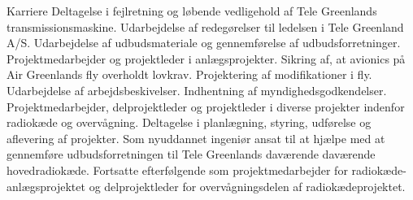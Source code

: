 \begin{rubric}{Karriere}
%
\entry*[mar 2014 -] Deltagelse i fejlretning og løbende vedligehold af Tele Greenlands transmissionsmaskine.
%
 Udarbejdelse af redegørelser til ledelsen i Tele Greenland A/S.
\entry*Udarbejdelse af udbudsmateriale og gennemførelse af udbudsforretninger.
\entry*Projektmedarbejder og projektleder i anlægsprojekter.
%
 Sikring af, at avionics på Air Greenlands fly overholdt lovkrav.
\entry*Projektering af modifikationer i fly.
\entry*Udarbejdelse af arbejdsbeskivelser.
\entry*Indhentning af myndighedsgodkendelser.
%
 Projektmedarbejder, delprojektleder og projektleder i diverse projekter indenfor radiokæde og overvågning.
\entry*Deltagelse i planlægning, styring, udførelse og aflevering af projekter.
%
 Som nyuddannet ingeniør ansat til at hjælpe med at gennemføre  udbudsforretningen til Tele Greenlands daværende daværende hovedradiokæde.
\entry*Fortsatte efterfølgende som projektmedarbejder for radiokæde-anlægsprojektet og delprojektleder for overvågningsdelen af radiokædeprojektet.
\end{rubric}
